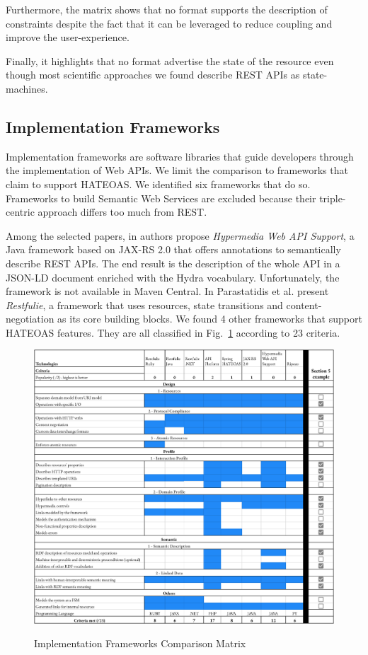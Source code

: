 Furthermore, the matrix shows that no format supports the description of constraints despite the fact that it can be leveraged to reduce coupling and improve the user-experience.

Finally, it highlights that no format advertise the state of the resource even though most scientific approaches we found describe REST APIs as state-machines.

\subsection{Implementation Frameworks}

Implementation frameworks are software libraries that guide developers through the implementation of Web APIs. We limit the comparison to frameworks that claim to support HATEOAS. We identified six frameworks that do so. Frameworks to build Semantic Web Services are excluded because their triple-centric approach differs too much from REST.

Among the selected papers, in \cite{salvadori2014framework} authors propose \textit{Hypermedia Web API Support}, a Java framework based on JAX-RS 2.0 that offers annotations to semantically describe REST APIs. The end result is the description of the whole API in a JSON-LD document enriched with the Hydra vocabulary. Unfortunately, the framework is not available in Maven Central. In \cite{parastatidis2010role} Parastatidis et al. present \textit{Restfulie}, a framework that uses resources, state transitions and content-negotiation as its core building blocks. We found 4 other frameworks that support HATEOAS features. They are all classified in Fig.~\ref{frameworks-matrix} according to 23 criteria.

\begin{figure}[!ht]
\caption{Implementation Frameworks Comparison Matrix}
\includegraphics[width=1\textwidth]{figures/frameworks.png}
\label{frameworks-matrix}
\end{figure}

